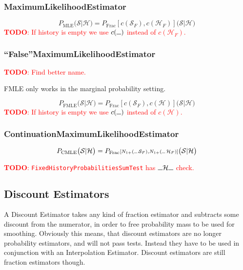 \documentclass[11pt,a4paper]{article}
\newcommand{\Seq}{\mathcal{S}}
\newcommand{\Hist}{\mathcal{H}}
\newcommand{\SeqF}{\mathcal{S}_F}
\newcommand{\HistF}{\mathcal{H}_F}
\newcommand{\Skp}{\rule{7pt}{.5pt}}
\newcommand{\SmallSkp}{\rule{5pt}{.3pt}}
\newcommand{\todo}[1]{\textcolor{red}{\textbf{TODO}: #1}}
\begin{document}
  \subsubsection{MaximumLikelihoodEstimator}

  \begin{equation}
    P_\mathrm{MLE}\big(\Seq | \Hist\big) = P_\mathrm{Frac}{\scriptstyle[c(\SeqF) , c(\HistF)]}\big(\Seq | \Hist\big)
  \end{equation}
  \todo{If history is empty we use $c(\Skp)$ instead of $c(\HistF)$.}

  \subsubsection{``False''MaximumLikelihoodEstimator}

  \todo{Find better name.}

  FMLE only works in the marginal probability setting.

  \begin{equation}
    P_\mathrm{FMLE}\big(\Seq | \Hist\big) = P_\mathrm{Frac}{\scriptstyle[c(\SeqF) , c(\Hist)]}\big(\Seq | \Hist\big)
  \end{equation}
  \todo{If history is empty we use $c(\Skp)$ instead of $c(\Hist)$.}

  \subsubsection{ContinuationMaximumLikelihoodEstimator}

  \begin{equation}
    P_\mathrm{CMLE}\big(\Seq | \Hist\big) = P_\mathrm{Frac}{\scriptstyle[N_{1+}(\SmallSkp \, \SeqF) , N_{1+}(\SmallSkp \, \HistF)]}\big(\Seq | \Hist\big)
  \end{equation}

  \todo{\texttt{FixedHistoryProbabilitiesSumTest} has $\Skp \Hist \Skp$ check.}

  \subsection{Discount Estimators}

  A Discount Estimator takes any kind of fraction estimator and subtracts some
  discount from the numerator, in order to free probability mass to be used for
  smoothing. Obviously this means, that discount estimators are no longer
  probability estimators, and will not pass tests. Instead they have to be used
  in conjunction with an Interpolation Estimator. Discount estimators are still
  fraction estimators though.
\end{document}
